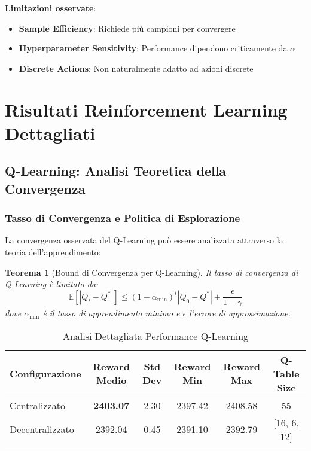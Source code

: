 \documentclass[12pt,a4paper,twoside]{report}
\newtheorem{theorem}{Teorema}[section]
\begin{document}
\begin{appendices}
\textbf{Limitazioni osservate}:
\begin{itemize}
    \item \textbf{Sample Efficiency}: Richiede più campioni per convergere
    \item \textbf{Hyperparameter Sensitivity}: Performance dipendono criticamente da $\alpha$
    \item \textbf{Discrete Actions}: Non naturalmente adatto ad azioni discrete
\end{itemize}

\section{Risultati Reinforcement Learning Dettagliati}

\subsection{Q-Learning: Analisi Teoretica della Convergenza}

\subsubsection{Tasso di Convergenza e Politica di Esplorazione}

La convergenza osservata del Q-Learning può essere analizzata attraverso la teoria dell'apprendimento:

\begin{theorem}[Bound di Convergenza per Q-Learning]
Il tasso di convergenza di Q-Learning è limitato da:
$$\mathbb{E}[|Q_t - Q^*|] \leq \left(1 - \alpha_{\min}\right)^t |Q_0 - Q^*| + \frac{\epsilon}{1-\gamma}$$
dove $\alpha_{\min}$ è il tasso di apprendimento minimo e $\epsilon$ l'errore di approssimazione.
\end{theorem}

\begin{table}[H]
\centering
\caption{Analisi Dettagliata Performance Q-Learning}
\label{tab:qlearning_detailed}
\begin{tabular}{|l|c|c|c|c|c|}
\hline
\textbf{Configurazione} & \textbf{Reward Medio} & \textbf{Std Dev} & \textbf{Reward Min} & \textbf{Reward Max} & \textbf{Q-Table Size} \\
\hline
Centralizzato & \textbf{2403.07} & 2.30 & 2397.42 & 2408.58 & 55 \\
Decentralizzato & 2392.04 & 0.45 & 2391.10 & 2392.79 & [16, 6, 12] \\
\hline
\end{tabular}
\end{table}


\end{appendices}
\end{document}
